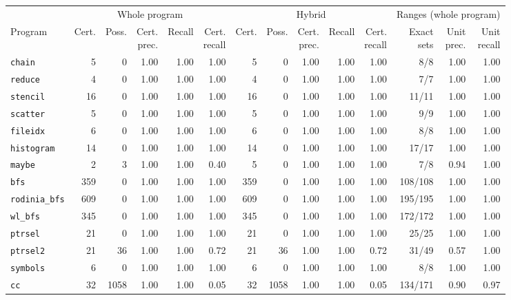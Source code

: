 \begin{tabular}{lrrrrr|rrrrr|rrr}
\toprule
 & \multicolumn{5}{c|}{Whole program} & \multicolumn{5}{c|}{Hybrid} & \multicolumn{3}{c}{Ranges (whole program)} \\
Program & Cert. & Poss. & \shortstack{Cert.\\prec.} & Recall & \shortstack{Cert.\\recall} & Cert. & Poss. & \shortstack{Cert.\\prec.} & Recall & \shortstack{Cert.\\recall} & \shortstack{Exact\\sets} & \shortstack{Unit\\prec.} & \shortstack{Unit\\recall} \\
\midrule
\texttt{chain} & 5 & 0 & 1.00 & 1.00 & 1.00 & 5 & 0 & 1.00 & 1.00 & 1.00 & 8/8 & 1.00 & 1.00 \\
\texttt{reduce} & 4 & 0 & 1.00 & 1.00 & 1.00 & 4 & 0 & 1.00 & 1.00 & 1.00 & 7/7 & 1.00 & 1.00 \\
\texttt{stencil} & 16 & 0 & 1.00 & 1.00 & 1.00 & 16 & 0 & 1.00 & 1.00 & 1.00 & 11/11 & 1.00 & 1.00 \\
\texttt{scatter} & 5 & 0 & 1.00 & 1.00 & 1.00 & 5 & 0 & 1.00 & 1.00 & 1.00 & 9/9 & 1.00 & 1.00 \\
\texttt{fileidx} & 6 & 0 & 1.00 & 1.00 & 1.00 & 6 & 0 & 1.00 & 1.00 & 1.00 & 8/8 & 1.00 & 1.00 \\
\texttt{histogram} & 14 & 0 & 1.00 & 1.00 & 1.00 & 14 & 0 & 1.00 & 1.00 & 1.00 & 17/17 & 1.00 & 1.00 \\
\texttt{maybe} & 2 & 3 & 1.00 & 1.00 & 0.40 & 5 & 0 & 1.00 & 1.00 & 1.00 & 7/8 & 0.94 & 1.00 \\
\texttt{bfs} & 359 & 0 & 1.00 & 1.00 & 1.00 & 359 & 0 & 1.00 & 1.00 & 1.00 & 108/108 & 1.00 & 1.00 \\
\texttt{rodinia\_bfs} & 609 & 0 & 1.00 & 1.00 & 1.00 & 609 & 0 & 1.00 & 1.00 & 1.00 & 195/195 & 1.00 & 1.00 \\
\texttt{wl\_bfs} & 345 & 0 & 1.00 & 1.00 & 1.00 & 345 & 0 & 1.00 & 1.00 & 1.00 & 172/172 & 1.00 & 1.00 \\
\texttt{ptrsel} & 21 & 0 & 1.00 & 1.00 & 1.00 & 21 & 0 & 1.00 & 1.00 & 1.00 & 25/25 & 1.00 & 1.00 \\
\texttt{ptrsel2} & 21 & 36 & 1.00 & 1.00 & 0.72 & 21 & 36 & 1.00 & 1.00 & 0.72 & 31/49 & 0.57 & 1.00 \\
\texttt{symbols} & 6 & 0 & 1.00 & 1.00 & 1.00 & 6 & 0 & 1.00 & 1.00 & 1.00 & 8/8 & 1.00 & 1.00 \\
\texttt{cc} & 32 & 1058 & 1.00 & 1.00 & 0.05 & 32 & 1058 & 1.00 & 1.00 & 0.05 & 134/171 & 0.90 & 0.97 \\
\bottomrule
\end{tabular}
